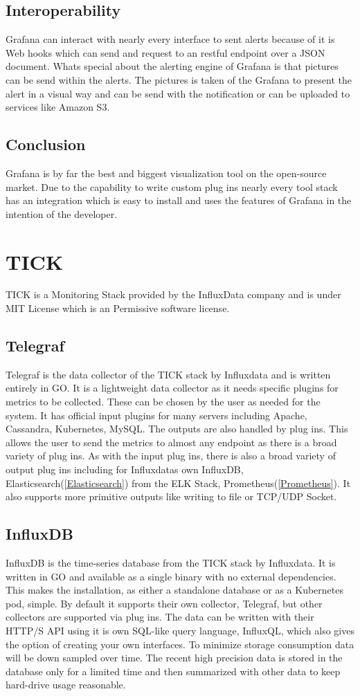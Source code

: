 \subsection{Interoperability}
Grafana can interact with nearly every interface to sent alerts because of it is Web hooks which can send and request to an restful endpoint over a JSON document. Whats special about the alerting engine of Grafana is that pictures can be send within the alerts. The pictures is taken of the Grafana to present the alert in a visual way and can be send with the notification or can be uploaded to services like Amazon S3.

\subsection{Conclusion}
Grafana is by far the best and biggest visualization tool on the open-source market. Due to the capability to write custom plug ins nearly every tool stack has an integration which is easy to install and uses the features of Grafana in the intention of the developer.

\section{TICK}
\label{tick}
TICK is a Monitoring Stack provided by the InfluxData company and is under MIT License which is an Permissive software license.
\subsection{Telegraf}
Telegraf is the data collector of the TICK stack by Influxdata and is written entirely in GO. It is a lightweight data collector as it needs specific plugins for metrics to be collected. These can be chosen by the user as needed for the system. It has official input plugins for many servers including Apache, Cassandra, Kubernetes, MySQL.
The outputs are also handled by plug ins. This allows the user to send the metrics to almost any endpoint as there is a broad variety of plug ins. As with the input plug ins, there is also a broad variety of output plug ins including for Influxdatas own InfluxDB, Elasticsearch(\ref{Elasticsearch}) from the ELK Stack, Prometheus(\ref{Prometheus}). It also supports more primitive outputs like writing to file or TCP/UDP Socket.
\subsection{InfluxDB}
InfluxDB is the time-series database from the TICK stack by Influxdata. It is written in GO and available as a single binary with no external dependencies. This makes the installation, as either a standalone database or as a Kubernetes pod, simple.
By default it supports their own collector, Telegraf, but other collectors are supported via plug ins. The data can be written with their  HTTP/S API using it is own SQL-like query language, InfluxQL, which also gives the option of creating your own interfaces.
To minimize storage consumption data will be down sampled over time. The recent high precision data is stored in the database only for a limited time and then summarized with other data to keep hard-drive usage reasonable. 
